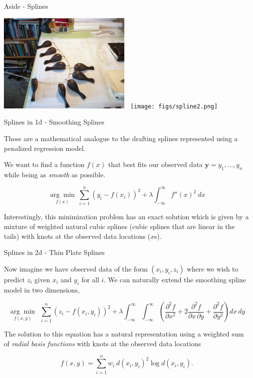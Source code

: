 \documentclass[11pt,ignorenonframetext,]{beamer}
\begin{document}
\begin{frame}{Aside - Splines}
\protect\hypertarget{aside---splines}{}

\begin{center}
\includegraphics[width=0.49\textwidth]{figs/spline1.png}
$~$
\texttt{[image: figs/spline2.png]}
\end{center}

\end{frame}

\begin{frame}[t]{Splines in 1d - Smoothing Splines}
\protect\hypertarget{splines-in-1d---smoothing-splines}{}

These are a mathematical analogue to the drafting splines represented
using a penalized regression model.

\pause

We want to find a function \(f(x)\) that best fits our observed data
\(\symbf{y} = y_1, \ldots, y_n\) while being as \emph{smooth} as
possible.

\[ \underset{f(x)}{\arg\min} ~ \sum_{i=1}^n\left(y_i - f(x_i)\right)^2 + \lambda \int_{-\infty}^\infty f''(x)^2 ~ dx \]

Interestingly, this minimization problem has an exact solution which is
given by a mixture of weighted natural cubic splines (cubic splines that
are linear in the tails) with knots at the observed data locations
(\(x\)s).

\end{frame}

\begin{frame}{Splines in 2d - Thin Plate Splines}
\protect\hypertarget{splines-in-2d---thin-plate-splines}{}

Now imagine we have observed data of the form \((x_i, y_i, z_i)\) where
we wish to predict \(z_i\) given \(x_i\) and \(y_i\) for all \(i\). We
can naturally extend the smoothing spline model in two dimensions,

\[ \underset{f(x,y)}{\arg\min} ~~ \sum_{i=1}^n (z_i-f(x_i,y_i))^2 + \lambda  \int_{-\infty}^\infty  \int_{-\infty}^\infty \left(\frac{\partial^2 f}{\partial x^2} + 2 \frac{\partial^2 f}{\partial x \, \partial y} + \frac{\partial^2 f}{\partial y^2} \right) dx\, dy\]

The solution to this equation has a natural representation using a
weighted sum of \emph{radial basis functions} with knots at the observed
data locations

\[ f(x,y) = \sum_{i=1}^n w_i ~ d(x_i,y_i)^2 \log d(x_i,y_i).  \]

\end{frame}
\end{document}
